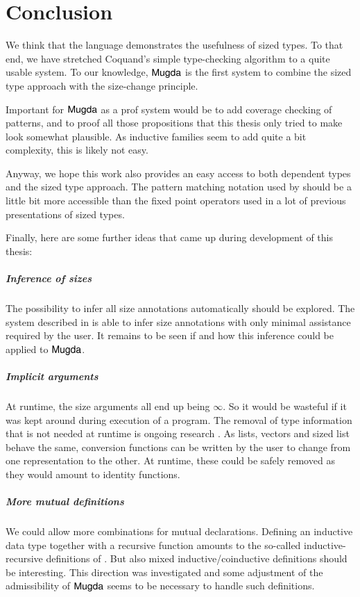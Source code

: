 \chapter{Conclusion}
We think that the \mugda language demonstrates the usefulness of sized types.
To that end, we have stretched Coquand's simple type-checking algorithm to a quite usable system.
To our knowledge, $\textsf{Mugda}$ is the first system to combine the sized type approach with the size-change principle.

Important for $\textsf{Mugda}$ as a prof system would be to add coverage checking of patterns, and to proof all those propositions that this thesis only tried to make look somewhat plausible. As inductive families seem to add quite a bit complexity, this is likely not easy.

Anyway, we hope this work also provides an easy access to both dependent types and the sized type approach.
The pattern matching notation used by \mugda should be a little bit more accessible than the fixed point operators used in a lot of previous presentations of sized types.

Finally, here are some further ideas that came up during development of this thesis:
\paragraph*{Inference of sizes}
The possibility to infer all size annotations automatically should be explored.
The system described in \cite{bgp:lpar06} is able to infer size annotations with only minimal assistance required by the user. It remains to be seen if and how this inference could be applied to $\textsf{Mugda}$.
\paragraph*{Implicit arguments}
At runtime, the size arguments all end up being $\infty$.
So it would be wasteful if it was kept around during execution of a program.
The removal of type information that is not needed at runtime is ongoing research \cite{miquel01implicit,DBLP:conf/types/BradyMM03}. As lists, vectors and sized list behave the same, conversion functions can be written by the user to change from one representation to the other. At runtime, these could be safely removed as they would amount to identity functions.
\paragraph*{More mutual definitions}
We could allow more combinations for mutual declarations.
Defining an inductive data type together with a recursive function amounts to the so-called inductive-recursive definitions of \cite{dybjer01indexed}. But also mixed inductive/coinductive definitions should be interesting. This direction was investigated and some adjustment of the admissibility of $\textsf{Mugda}$ seems to be necessary to handle such definitions.
